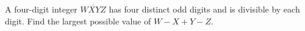 A four-digit integer $\overline{WXYZ}$ has four distinct odd digits and is divisible by each digit. Find the largest possible value of $W-X+Y-Z$.
